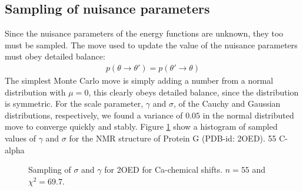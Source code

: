 \subsection{Sampling of nuisance parameters}
Since the nuisance parameters of the energy functions are unknown, they too must be sampled.
The move used to update the value of the nuisance parameters must obey detailed balance:
\begin{eqnarray}
    p\left(\theta \rightarrow \theta'\right) = p\left(\theta' \rightarrow \theta\right)
\end{eqnarray}
The simplest Monte Carlo move is simply adding a number from a normal distribution with $\mu = 0$, this clearly obeys detailed balance, since the distribution is symmetric.
For the scale parameter, $\gamma$ and $\sigma$, of the Cauchy and Gaussian distributions, respectively, we found a variance of $0.05$ in the normal distributed move to converge quickly and stably.
Figure \ref{fig:example} show a histogram of sampled values of $\gamma$ and $\sigma$ for the NMR structure of Protein G (PDB-id: 2OED). 55 C-alpha 





\begin{figure}%
    \centering
    \qquad
    \caption{Sampling of $\sigma$ and $\gamma$ for 2OED for Ca-chemical shifts. $n = 55$ and $\chi^2 = 69.7$.}
    \label{fig:example}%
\end{figure}

